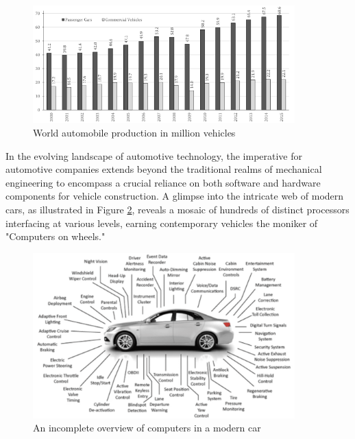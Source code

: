 \begin{figure}[h]  %
  \centering
  \includegraphics[width=0.9\textwidth]{images/automotive_world production.png}  %
  \caption{World automobile production in million vehicles \cite{automotiveInCentralEurope}}
  \label{fig:WorldAutomobileProduction}
\end{figure}

In the evolving landscape of automotive technology, the imperative for automotive companies extends beyond the traditional realms of mechanical engineering to encompass a crucial reliance on both software and hardware components for vehicle construction. A glimpse into the intricate web of modern cars, as illustrated in Figure \ref{fig:VheicleProcessors}, reveals a mosaic of hundreds of distinct processors interfacing at various levels, earning contemporary vehicles the moniker of "Computers on wheels."

\begin{figure}[h]  %
  \centering
  \includegraphics[width=0.9\textwidth]{images/vehicle_processors.png}  %
  \caption{An incomplete overview of computers in a modern car \cite{ieeeSoftwareDefinedVehicle}}
  \label{fig:VheicleProcessors}
\end{figure}

